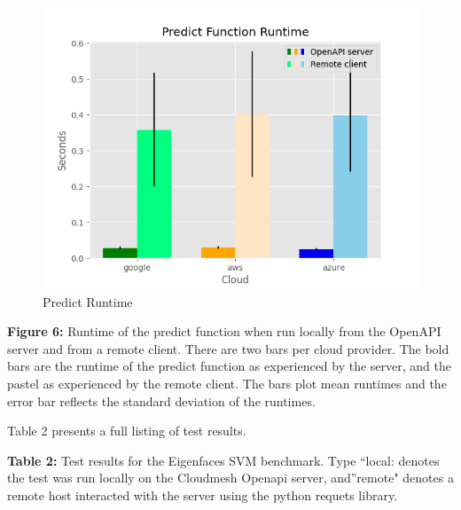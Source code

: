 \begin{figure}
\centering
\includegraphics{../images/sample_graph_4.png}
\caption{Predict Runtime}
\end{figure}

\textbf{Figure 6:} Runtime of the predict function when run locally from
the OpenAPI server and from a remote client. There are two bars per
cloud provider. The bold bars are the runtime of the predict function as
experienced by the server, and the pastel as experienced by the remote
client. The bars plot mean runtimes and the error bar reflects the
standard deviation of the runtimes.

Table 2 presents a full listing of test results.

\textbf{Table 2:} Test results for the Eigenfaces SVM benchmark. Type
``local: denotes the test was run locally on the Cloudmesh Openapi
server, and''remote" denotes a remote host interacted with the server
using the python requets library.

